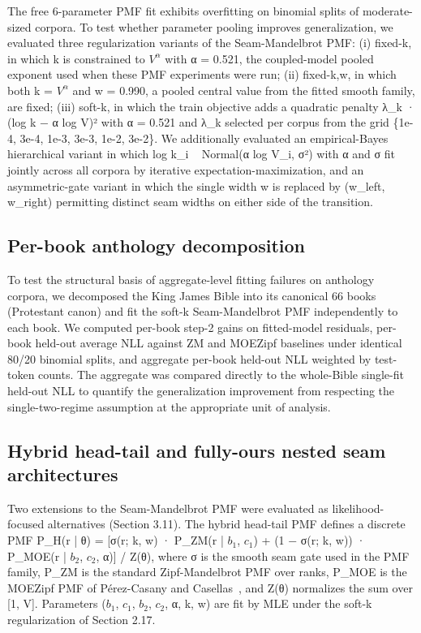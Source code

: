 \documentclass[11pt]{article}
\begin{document}
The free 6-parameter PMF fit exhibits overfitting on binomial splits of moderate-sized corpora. To test whether parameter pooling improves generalization, we evaluated three regularization variants of the Seam-Mandelbrot PMF: (i) fixed-k, in which k is constrained to $V^{\alpha}$ with α = 0.521, the coupled-model pooled exponent used when these PMF experiments were run; (ii) fixed-k,w, in which both k = $V^{\alpha}$ and w = 0.990, a pooled central value from the fitted smooth family, are fixed; (iii) soft-k, in which the train objective adds a quadratic penalty λ\_k · (log k − α log V)² with α = 0.521 and λ\_k selected per corpus from the grid \{1e-4, 3e-4, 1e-3, 3e-3, 1e-2, 3e-2\}. We additionally evaluated an empirical-Bayes hierarchical variant in which log k\_i ~ Normal(α log V\_i, σ²) with α and σ fit jointly across all corpora by iterative expectation-maximization, and an asymmetric-gate variant in which the single width w is replaced by (w\_left, w\_right) permitting distinct seam widths on either side of the transition.

\subsection{Per-book anthology decomposition}

To test the structural basis of aggregate-level fitting failures on anthology corpora, we decomposed the King James Bible into its canonical 66 books (Protestant canon) and fit the soft-k Seam-Mandelbrot PMF independently to each book. We computed per-book step-2 gains on fitted-model residuals, per-book held-out average NLL against ZM and MOEZipf baselines under identical 80/20 binomial splits, and aggregate per-book held-out NLL weighted by test-token counts. The aggregate was compared directly to the whole-Bible single-fit held-out NLL to quantify the generalization improvement from respecting the single-two-regime assumption at the appropriate unit of analysis.

\subsection{Hybrid head-tail and fully-ours nested seam architectures}

Two extensions to the Seam-Mandelbrot PMF were evaluated as likelihood-focused alternatives (Section 3.11). The hybrid head-tail PMF defines a discrete PMF P\_H(r | θ) = [σ(r; k, w) · P\_ZM(r | $b_1$, $c_1$) + (1 − σ(r; k, w)) · P\_MOE(r | $b_2$, $c_2$, α)] / Z(θ), where σ is the smooth seam gate used in the PMF family, P\_ZM is the standard Zipf-Mandelbrot PMF over ranks, P\_MOE is the MOEZipf PMF of Pérez-Casany and Casellas~\cite{perez2013}, and Z(θ) normalizes the sum over [1, V]. Parameters ($b_1$, $c_1$, $b_2$, $c_2$, α, k, w) are fit by MLE under the soft-k regularization of Section 2.17.
\end{document}
